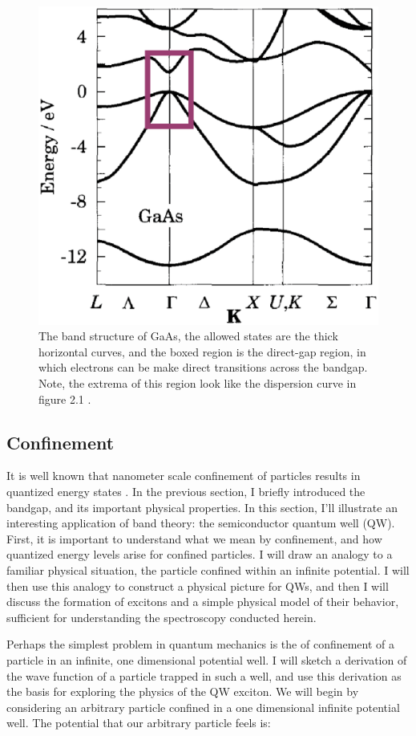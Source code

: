 \begin{figure}[h!]
\centering
\includegraphics[width = .3\textwidth]{GaAsBstruct.eps}
\caption{\doublespacing The band structure of GaAs, the allowed states are the thick horizontal curves, and the boxed region is the direct-gap region, in which electrons can be make direct transitions across the bandgap. Note, the extrema of this region look like the dispersion curve in figure 2.1 \cite{davies}.}
\label{GaAsBstruct}
\end{figure}


\newpage
\subsection{Confinement}
\indent It is well known that nanometer scale confinement of particles results in quantized energy states \cite{griffiths}. In the previous section, I briefly introduced the bandgap, and its important physical properties. In this section, I'll illustrate an interesting application of band theory: the semiconductor quantum well (QW). First, it is important to understand what we mean by confinement, and how quantized energy levels arise for confined particles. I will draw an analogy to a familiar physical situation, the particle confined within an infinite potential. I will then use this analogy to construct a physical picture for QWs, and then I will discuss the formation of excitons and a simple physical model of their behavior, sufficient for understanding the spectroscopy conducted herein.

\indent Perhaps the simplest problem in quantum mechanics is the of confinement of a particle in an infinite, one dimensional potential well. I will sketch a derivation of the wave function of a particle trapped in such a well, and use this derivation as the basis for exploring the physics of the QW exciton. We will begin by considering an arbitrary particle confined in a one dimensional infinite potential well. The potential that our arbitrary particle feels is:

